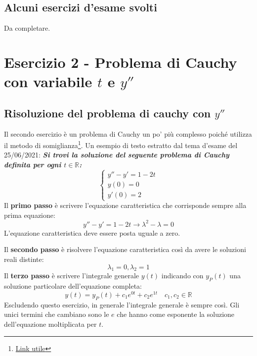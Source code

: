 \documentclass[a4paper]{article}
\begin{document}
	\subsection{Alcuni esercizi d'esame svolti}
	Da completare.
	\newpage

	\section{Esercizio 2 - Problema di Cauchy con variabile $t$ e $y''$}

	\subsection{Risoluzione del problema di cauchy con $y''$}

	Il secondo esercizio è un problema di Cauchy un po' più complesso poiché utilizza il metodo di somiglianza\footnote{\href{https://youtu.be/Ij2V7cj_lh8}{Link utile}}. Un esempio di testo estratto dal tema d'esame del 25/06/2021: \textcolor{Green4}{\textbf{\emph{Si trovi la soluzione del seguente problema di Cauchy definita per ogni $t \in \mathbb{R}$:}}}
	\begin{equation*}
		\begin{cases}
			y'' - y' = 1 - 2t \\
			y\left(0\right) = 0 \\
			y'\left(0\right) = 2
		\end{cases}
	\end{equation*}
	Il \textbf{primo passo} è scrivere l'equazione caratteristica che corrisponde sempre alla prima equazione:
	\begin{equation*}
		y'' - y' = 1 - 2t \longrightarrow \lambda^{2} - \lambda = 0
	\end{equation*}
	L'equazione caratteristica deve essere posta uguale a zero.\newline

	\noindent
	Il \textbf{secondo passo} è risolvere l'equazione caratteristica così da avere le soluzioni reali distinte:
	\begin{equation*}
		\lambda_{1} = 0, \lambda_{2} = 1
	\end{equation*}
	Il \textbf{terzo passo} è scrivere l'integrale generale $y\left(t\right)$ indicando con $y_{P}\left(t\right)$ una soluzione particolare dell'equazione completa:
	\begin{equation*}
		y\left(t\right) = y_{P}\left(t\right) + c_{1}e^{0t} + c_{2}e^{1t} \hspace{1em} c_{1}, c_{2} \in \mathbb{R}
	\end{equation*}
	Escludendo questo esercizio, in generale l'integrale generale è sempre così. Gli unici termini che cambiano sono le $e$ che hanno come esponente la soluzione dell'equazione moltiplicata per $t$.\newline
\end{document}
